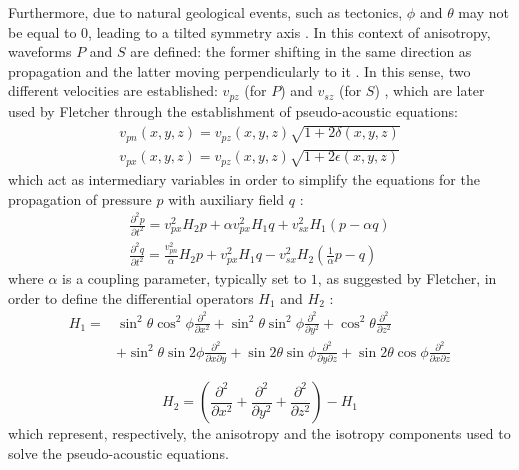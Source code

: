 \documentclass[cic,tc,english]{infufrgs}
\begin{document}
Furthermore, due to natural geological events, such as tectonics,
$\phi$ and $\theta$ may not be equal to $0$, leading to a tilted
symmetry axis \cite{fletcher}. In this context of anisotropy, waveforms $P$ and
$S$ are defined: the former shifting in the same direction as
propagation and the latter moving perpendicularly to it
\cite{fletcher}. In this sense, two different velocities are
established: $v_{pz}$ (for $P$) and $v_{sz}$ (for $S$)
\cite{fletcher_modeling}, which are later used by Fletcher through
the establishment of pseudo-acoustic equations:
\begin{gather}
  v_{pn}(x, y, z) = v_{pz}(x, y, z)\sqrt{1 + 2\delta(x, y, z)} \\
  v_{px}(x, y, z) = v_{pz}(x, y, z)\sqrt{1 + 2\epsilon(x, y, z)}
\end{gather}
which act as intermediary variables in order to simplify the
equations for the propagation of pressure $p$ with auxiliary field
$q$ \cite{fletcher_modeling, fletcher}:
\begin{gather}
  \frac{\partial^{2}p}{\partial t^{2}} = v_{px}^{2}H_{2}p + \alpha
  v_{px}^{2}H_{1}q + v_{sx}^{2}H_{1}(p - \alpha q) \\
  \frac{\partial^{2}q}{\partial t^{2}} =
  \frac{v_{pn}^{2}}{\alpha}H_{2}p + v_{px}^{2}H_{1}q -
  v_{sx}^{2}H_{2}(\frac{1}{\alpha}p - q)
\end{gather}
where $\alpha$ is a coupling parameter, typically set to $1$, as suggested
by Fletcher, in order to define the differential operators $H_1$ and
$H_2$ \cite{fletcher}:
\begin{equation}
  \begin{aligned}
    H_{1} = &\sin^{2}\theta \cos^{2}\phi \frac{\partial^{2}}{\partial
    x^{2}} + \sin^{2}\theta \sin^{2}\phi \frac{\partial^{2}}{\partial
    y^{2}} + \cos^{2}\theta \frac{\partial^{2}}{\partial z^{2}} \\
    &+ \sin^{2}\theta \sin 2\phi \frac{\partial^{2}}{\partial x
    \partial y} + \sin 2\theta \sin \phi \frac{\partial^{2}}{\partial
    y \partial z} + \sin 2\theta \cos \phi
    \frac{\partial^{2}}{\partial x \partial z}
  \end{aligned}
\end{equation}

\begin{equation}
  H_{2} = \left( \frac{\partial^{2}}{\partial x^{2}} +
    \frac{\partial^{2}}{\partial y^{2}} + \frac{\partial^{2}}{\partial
  z^{2}} \right) - H_{1}
\end{equation}
which represent, respectively, the anisotropy and the isotropy components
used to solve the pseudo-acoustic equations.
\end{document}
